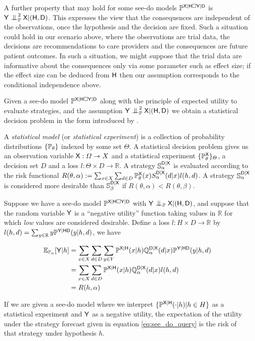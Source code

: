 A further property that may hold for some see-do models $\mathbb{P}^{\mathsf{X}|\mathsf{H}\square \mathsf{Y}|\mathsf{D}}$ is $\RV{Y}\CI^2_{\prob{P}} \RV{X}|(\RV{H},\RV{D})$. This expresses the view that the consequences are independent of the observations, once the hypothesis and the decision are fixed. Such a situation could hold in our scenario above, where the observations are trial data, the decisions are recommendations to care providers and the consequences are future patient outcomes. In such a situation, we might suppose that the trial data are informative about the consequences only via some parameter such as effect size; if the effect size can be deduced from $\mathsf{H}$ then our assumption corresponds to the conditional independence above.

Given a see-do model $\mathbb{P}^{\mathsf{X}|\mathsf{H}\square \mathsf{Y}|\mathsf{D}}$ along with the principle of expected utility to evaluate strategies, and the assumption $\RV{Y}\CI^2_{\prob{P}} \RV{X}|(\RV{H},\RV{D})$ we obtain a statistical decision problem in the form introduced by \citet{wald_statistical_1950}.

A \emph{statistical model} (or \emph{statistical experiment}) is a collection of probability distributions $\{\mathbb{P}_\theta\}$ indexed by some set $\Theta$. A statistical decision problem gives us an observation variable $\mathsf{X}:\Omega\rightarrowtriangle X$ and a statistical experiment $\{\mathbb{P}^{\mathsf{X}}_\theta\}_\Theta$, a decision set $D$ and a loss $l:\Theta\times D\to \mathbb{R}$. A strategy $\mathbb{S}^{\mathsf{D}|\mathsf{X}}_\alpha$ is evaluated according to the risk functional $R(\theta,\alpha):=\sum_{x\in X}\sum_{d\in D} \mathbb{P}^{\mathsf{X}}_\theta(x) S^{\mathsf{D}|\mathsf{X}}_\alpha (d|x) l(h,d)$. A strategy $\mathbb{S}^{\mathsf{D}|\mathsf{X}}_\alpha$ is considered more desirable than $\mathbb{S}^{\mathsf{D}|\mathsf{X}}_\beta$ if $R(\theta,\alpha)<R(\theta,\beta)$.

Suppose we have a see-do model $\mathbb{P}^{\mathsf{X}|\mathsf{H}\square \mathsf{Y}|\mathsf{D}}$ with $\RV{Y}\CI_{\model{P}} \RV{X}|(\RV{H,D})$, and suppose that the random variable $\mathsf{Y}$ is a ``negative utility'' function taking values in $\mathbb{R}$ for which \emph{low} values are considered desirable. Define a loss $l:H\times D\to \mathbb{R}$ by $l(h,d) = \sum_{y\in \mathbb{R}} y\mathbb{P}^{\mathsf{Y}|\mathsf{H}\mathsf{D}}(y|h,d)$, we have 

\begin{align}
    \mathbb{E}_{\mathbb{P}_{\alpha}}[\mathsf{Y}|h] &= \sum_{x\in X} \sum_{d\in D} \sum_{y\in Y} \mathbb{P}^{\mathsf{X}|\mathsf{H}}(x|h) \mathbb{Q}_\alpha^{\mathsf{D}|\mathsf{X}}(d|x) \mathbb{P}^{\mathsf{Y}|\mathsf{HD}}(y|h,d)\\
    &= \sum_{x\in X} \sum_{d\in D} \mathbb{P}^{\mathsf{X}|\mathsf{H}}(x|h) \mathbb{Q}_\alpha^{\mathsf{D}|\mathsf{X}}(d|x) l(h,d)\\
    &= R(h,\alpha)
\end{align}

If we are given a see-do model where we interpret $\{\mathbb{P}^{\mathsf{X}|\mathsf{H}}(\cdot|h)|h\in H\}$ as a statistical experiment and $\mathsf{Y}$ as a negative utility, the expectation of the utility under the strategy forecast given in equation \ref{eq:see_do_query} is the risk of that strategy under hypothesis $h$.

